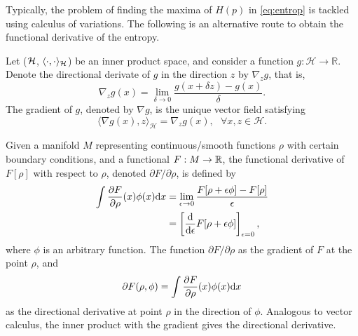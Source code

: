 Typically, the problem of finding the maxima of $H(p)$ in \cref{eq:entrop} is tackled using calculus of variations.
The following is an alternative route to obtain the functional derivative of the entropy.

\begin{definition}
  Let (${\mathcal H}$, $\langle\cdot,\cdot\rangle_{\mathcal H}$) be an inner product space, and consider a function $g:\mathcal H \rightarrow \mathbb R$. 
  Denote the directional derivate of $g$ in the direction $z$ by $\nabla_z g$, that is, 
	\[
		\nabla_z g(x) = \lim_{\delta \rightarrow 0} \frac{g(x + \delta z) - g(x)}{\delta}.
	\]
	The gradient of $g$, denoted by $\nabla g$, is the unique vector field satisfying 
	\[
		\langle \nabla g(x), z \rangle_{\mathcal H} = \nabla_z g(x), \ \ \ \forall x,z \in \mathcal H.
	\]
\end{definition}

\begin{definition}
  Given a manifold $M$ representing continuous/smooth functions $\rho$ with certain boundary conditions, and a functional $F:M\to\mathbb{R}$, the functional derivative of $F[\rho]$ with respect to $\rho$, denoted $\partial F/\partial\rho$, is defined by
  \begin{align*}
    \int \frac{\partial F}{\partial\rho}(x)\phi(x)\text{d} x
    &= \lim_{\epsilon\to 0} \frac{F[\rho + \epsilon\phi] - F[\rho]}{\epsilon} \\
    &= \left[ \frac{\text{d}}{\text{d} \epsilon} F[\rho + \epsilon\phi] \right]_{\epsilon=0},
  \end{align*}
  where $\phi$ is an arbitrary function.
  The function $\partial F/\partial\rho$ as the gradient of $F$ at the point $\rho$, and
  \[
    \partial F(\rho,\phi) = \int \frac{\partial F}{\partial\rho}(x)\phi(x) \text{d} x
  \]
  as the directional derivative at point $\rho$ in the direction of $\phi$.
  Analogous to vector calculus, the inner product with the gradient gives the directional derivative.
\end{definition}

